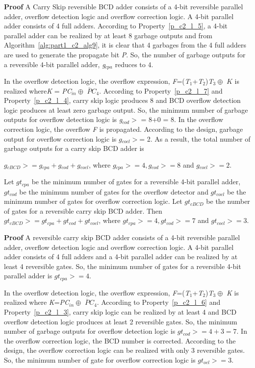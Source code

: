 \noindent\textbf{Proof}
A Carry Skip reversible BCD adder consists of a {4}-bit reversible parallel adder, overflow detection logic and overflow correction logic. A {4}-bit parallel adder consists of 4 full adders. According to Property~\ref{p_c2_l_5}, a {4}-bit parallel adder can be realized by at least 8 garbage outputs and from Algorithm~\ref{alg:part1_c2_alg9}, it is clear that 4 garbages from the 4 full adders are used to generate the propagate bit {\it P}. So, the number of garbage outputs for a reversible {4}-bit parallel adder, {\it g}${}_{cpa}$ reduces to 4.

In the overflow detection logic, the overflow expression, {\it F}=({\it T}${}_{1}$+{\it T}${}_{2}$){\it T}${}_{3} \oplus$ $K$ is realized where{\it K} = {\it PC}${}_{in}\oplus$ {\it $\overline{P}C$}${}_{4}$. According to Property~\ref{p_c2_l_7} and Property~\ref{p_c2_l_4}, carry skip logic produces 8 and BCD overflow detection logic produces at least zero garbage output. So, the minimum number of garbage outputs for overflow detection logic is {\it g}${}_{cod}$${>}$ = 8+0 = 8. In the overflow correction logic, the overflow {\it F }is propagated. According to the design, garbage output for overflow correction logic is $g{}_{cocl}$${>}$= 2. As a result, the total number of garbage outputs for a carry skip BCD adder is

$g{}_{cBCD}{>}= g{}_{cpa} + g{}_{cod} + g{}_{cocl}$, where $g{}_{cpa}{>}= 4, g{}_{cod}{>} = 8$ and $g{}_{cocl}{>}= 2$.

\begin{property}\textnormal{
Let $gt{}_{cpa}$ be the minimum number of gates for a reversible 4-bit parallel adder, $gt{}_{cod}$ be the minimum number of gates for the overflow detector and $gt{}_{cocl}$ be the minimum number of gates for overflow correction logic. Let $gt{}_{cBCD}$ be the number of gates for a reversible carry skip BCD adder. Then
$gt{}_{cBCD}{>} = gt{}_{cpa} + gt{}_{cod} + gt{}_{cocl}$, where $gt{}_{cpa}{>}= 4, gt{}_{cod}{>}= 7$ and $gt{}_{cocl}{>}= 3.$}
\end{property}

\noindent\textbf{Proof}
A reversible carry skip BCD adder consists of a {4}-bit reversible parallel adder, overflow detection logic and overflow correction logic. A {4}-bit parallel adder consists of 4 full adders and a {4}-bit parallel adder can be realized by at least 4 reversible gates. So, the minimum number of gates for a reversible {4}-bit parallel adder is $gt{}_{cpa}{>}= 4$.

In the overflow detection logic, the overflow expression, {\it F}=({\it T}${}_{1}$+{\it T}${}_{2}$){\it T}${}_{3} \oplus$ {\it K} is realized where {\it K}={\it PC}${}_{in}\oplus$ {\it $\overline{P}C$}${}_{4}$. According to Property~\ref{p_c2_l_6} and Property~\ref{p_c2_l_3}, carry skip logic can be realized by at least 4 and BCD overflow detection logic produces at least 2 reversible gates. So, the minimum number of garbage outputs for overflow detection logic is $gt{}_{cod}{>} = 4+3=7$. In the overflow correction logic, the BCD number is corrected. According to the design, the overflow correction logic can be realized with only 3 reversible gates. So, the minimum number of gate for overflow correction logic is $gt{}_{ocl}{>} = 3$.

